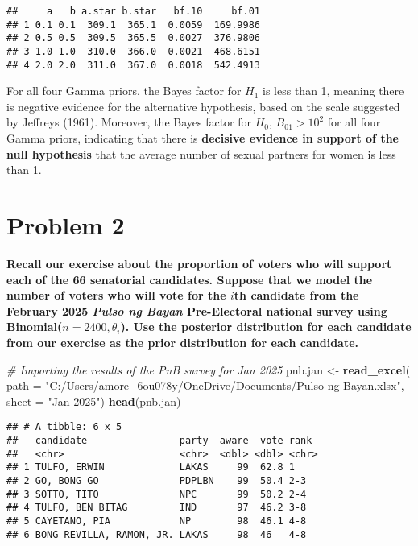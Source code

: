 \documentclass[]{article}
\newenvironment{Shaded}{\begin{snugshade}}{\end{snugshade}}
\newcommand{\AttributeTok}[1]{\textcolor[rgb]{0.13,0.29,0.53}{#1}}
\newcommand{\CommentTok}[1]{\textcolor[rgb]{0.56,0.35,0.01}{\textit{#1}}}
\newcommand{\FunctionTok}[1]{\textcolor[rgb]{0.13,0.29,0.53}{\textbf{#1}}}
\newcommand{\NormalTok}[1]{#1}
\newcommand{\OtherTok}[1]{\textcolor[rgb]{0.56,0.35,0.01}{#1}}
\newcommand{\StringTok}[1]{\textcolor[rgb]{0.31,0.60,0.02}{#1}}
\begin{document}
\begin{enumerate}
\begin{verbatim}
##     a   b a.star b.star   bf.10     bf.01
## 1 0.1 0.1  309.1  365.1  0.0059  169.9986
## 2 0.5 0.5  309.5  365.5  0.0027  376.9806
## 3 1.0 1.0  310.0  366.0  0.0021  468.6151
## 4 2.0 2.0  311.0  367.0  0.0018  542.4913
\end{verbatim}

For all four Gamma priors, the Bayes factor for $H_1$ is less than 1, meaning there is negative evidence for the alternative hypothesis, based on the scale suggested by Jeffreys (1961). Moreover, the Bayes factor for $H_0$, $B_{01} > 10^2$ for all four Gamma priors, indicating that there is \textbf{decisive evidence in support of the null hypothesis} that the average number of sexual partners for women is less than 1.

\end{enumerate}

\section{Problem 2}
\textbf{Recall our exercise about the proportion of voters who will support each of the 66 senatorial candidates. Suppose that we model the number of voters who will vote for the $i$th candidate from the February 2025 \textit{Pulso ng Bayan} Pre-Electoral national survey using Binomial($n = 2400,\theta_i$). Use the posterior distribution for each candidate from our exercise as the prior distribution for each candidate.} \\

\begin{Shaded}
\begin{Highlighting}[]
\CommentTok{\# Importing the results of the PnB survey for Jan 2025}
\NormalTok{pnb.jan }\OtherTok{\textless{}{-}} \FunctionTok{read\_excel}\NormalTok{(}
    \AttributeTok{path =} \StringTok{"C:/Users/amore\_6ou078y/OneDrive/Documents/Pulso ng Bayan.xlsx"}\NormalTok{, }
    \AttributeTok{sheet =} \StringTok{"Jan 2025"}\NormalTok{)}
\FunctionTok{head}\NormalTok{(pnb.jan)}
\end{Highlighting}
\end{Shaded}

\begin{verbatim}
## # A tibble: 6 x 5
##   candidate                party  aware  vote rank 
##   <chr>                    <chr>  <dbl> <dbl> <chr>
## 1 TULFO, ERWIN             LAKAS     99  62.8 1    
## 2 GO, BONG GO              PDPLBN    99  50.4 2-3  
## 3 SOTTO, TITO              NPC       99  50.2 2-4  
## 4 TULFO, BEN BITAG         IND       97  46.2 3-8  
## 5 CAYETANO, PIA            NP        98  46.1 4-8  
## 6 BONG REVILLA, RAMON, JR. LAKAS     98  46   4-8
\end{verbatim}
\end{document}
